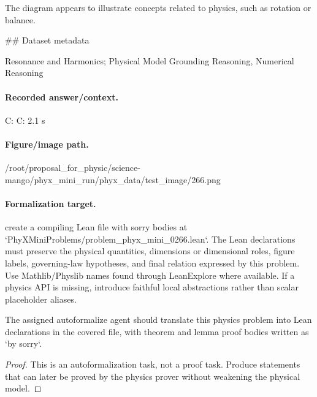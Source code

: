 The diagram appears to illustrate concepts related to physics, such as rotation or balance.

\#\# Dataset metadata

Resonance and Harmonics; Physical Model Grounding Reasoning, Numerical Reasoning

\paragraph{Recorded answer/context.}
C: C: 2.1 s

\paragraph{Figure/image path.}
/root/proposal\_for\_physic/science-mango/phyx\_mini\_run/phyx\_data/test\_image/266.png

\paragraph{Formalization target.}
create a compiling Lean file with sorry bodies at `PhyXMiniProblems/problem\_phyx\_mini\_0266.lean`. The Lean declarations must preserve the physical quantities, dimensions or dimensional roles, figure labels, governing-law hypotheses, and final relation expressed by this problem.
Use Mathlib/Physlib names found through LeanExplore where available. If a physics API is missing, introduce faithful local abstractions rather than scalar placeholder aliases.

\begin{theorem}
\label{thm:physics:phyx_mini_0266:target}
The assigned autoformalize agent should translate this physics problem into Lean declarations in the covered file, with theorem and lemma proof bodies written as `by sorry`.
\end{theorem}
\begin{proof}
This is an autoformalization task, not a proof task. Produce statements that can later be proved by the physics prover without weakening the physical model.
\end{proof}

